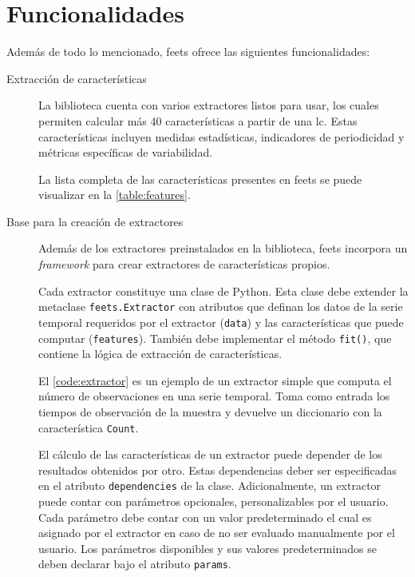 \section{Funcionalidades}

Además de todo lo mencionado, \gls{feets} ofrece las siguientes funcionalidades:

\begin{description}
    \item[Extracción de características]
     La biblioteca cuenta con varios extractores listos para usar, los cuales permiten calcular más 40 características a partir de una \gls{lc}. Estas características incluyen medidas estadísticas, indicadores de periodicidad y métricas específicas de variabilidad.
     
     La lista completa de las características presentes en \gls{feets} se puede visualizar en la \autoref{table:features}.

    \item[Base para la creación de extractores]
    Además de los extractores preinstalados en la biblioteca, \gls{feets} incorpora un \emph{framework} para crear extractores de características propios.
    
    Cada extractor constituye una clase de Python. Esta clase debe extender la metaclase \texttt{feets.Extractor} con atributos que definan los datos de la serie temporal requeridos por el extractor (\texttt{data}) y las características que puede computar (\texttt{features}). También debe implementar el método \texttt{fit()}, que contiene la lógica de extracción de características.

    El \autoref{code:extractor} es un ejemplo de un extractor simple que computa el número de observaciones en una serie temporal. Toma como entrada los tiempos de observación de la muestra y devuelve un diccionario con la característica \texttt{Count}.

    El cálculo de las características de un extractor puede depender de los resultados obtenidos por otro. Estas dependencias deber ser especificadas en el atributo \texttt{dependencies} de la clase. Adicionalmente, un extractor puede contar con parámetros opcionales, personalizables por el usuario. Cada parámetro debe contar con un valor predeterminado el cual es asignado por el extractor en caso de no ser evaluado manualmente por el usuario. Los parámetros disponibles y sus valores predeterminados se deben declarar bajo el atributo \texttt{params}.
\end{description}

